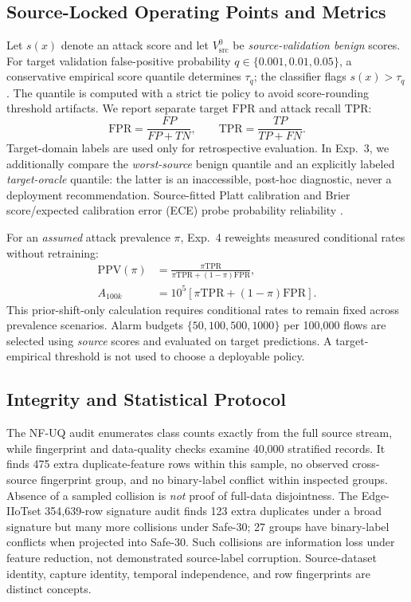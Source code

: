 \documentclass[journal,10pt]{IEEEtran}
\newcommand{\tp}{\mathrm{TPR}}
\newcommand{\fpr}{\mathrm{FPR}}
\begin{document}
\subsection{Source-Locked Operating Points and Metrics}
Let $s(x)$ denote an attack score and let $V^0_{\mathrm{src}}$ be \emph{source-validation benign} scores. For target validation false-positive probability $q\in\{0.001,0.01,0.05\}$, a conservative empirical score quantile determines $\tau_q$; the classifier flags $s(x)>\tau_q$. The quantile is computed with a strict tie policy to avoid score-rounding threshold artifacts. We report separate target $\fpr$ and attack recall $\tp$: 
\begin{equation}
\fpr=\frac{FP}{FP+TN},\qquad \tp=\frac{TP}{TP+FN}.
\label{eq:fpr}
\end{equation}
Target-domain labels are used only for retrospective evaluation. In Exp.~3, we additionally compare the \emph{worst-source} benign quantile and an explicitly labeled \emph{target-oracle} quantile: the latter is an inaccessible, post-hoc diagnostic, never a deployment recommendation. Source-fitted Platt calibration and Brier score/expected calibration error (ECE) probe probability reliability \cite{guo2017,ovadia2019}.

For an \emph{assumed} attack prevalence $\pi$, Exp.~4 reweights measured conditional rates without retraining:
\begin{align}
\mathrm{PPV}(\pi)&=\frac{\pi\tp}{\pi\tp+(1-\pi)\fpr},\nonumber\\
A_{100k}&=10^5[\pi\tp+(1-\pi)\fpr].
\label{eq:ppv}
\end{align}
This prior-shift-only calculation requires conditional rates to remain fixed across prevalence scenarios. Alarm budgets $\{50,100,500,1000\}$ per 100,000 flows are selected using \emph{source} scores and evaluated on target predictions. A target-empirical threshold is not used to choose a deployable policy.

\subsection{Integrity and Statistical Protocol}
The NF-UQ audit enumerates class counts exactly from the full source stream, while fingerprint and data-quality checks examine 40,000 stratified records. It finds 475 extra duplicate-feature rows within this sample, no observed cross-source fingerprint group, and no binary-label conflict within inspected groups. Absence of a sampled collision is \emph{not} proof of full-data disjointness. The Edge-IIoTset 354,639-row signature audit finds 123 extra duplicates under a broad signature but many more collisions under Safe-30; 27 groups have binary-label conflicts when projected into Safe-30. Such collisions are information loss under feature reduction, not demonstrated source-label corruption. Source-dataset identity, capture identity, temporal independence, and row fingerprints are distinct concepts.
\end{document}

